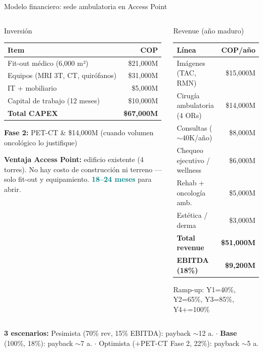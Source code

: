 \documentclass[aspectratio=169, 11pt]{beamer}
\newcommand{\highlight}[1]{\textcolor{teal}{\textbf{#1}}}
\begin{document}
\begin{frame}{Modelo financiero: sede ambulatoria en Access Point}
\begin{columns}[T]
\begin{block}{\small Inversión}
\scriptsize
\begin{tabular}{@{}lr@{}}
\toprule
\textbf{Item} & \textbf{COP} \\
\midrule
Fit-out médico (6,000 m²) & \$21,000M \\
Equipos (MRI 3T, CT, quirófanos) & \$31,000M \\
IT + mobiliario & \$5,000M \\
Capital de trabajo (12 meses) & \$10,000M \\
\midrule
\textbf{Total CAPEX} & \textbf{\$67,000M} \\
\bottomrule
\end{tabular}

\vspace{2pt}
{\tiny\textbf{Fase 2:} PET-CT \& \$14,000M (cuando volumen oncológico lo justifique)}

\vspace{2pt}
{\tiny\textbf{Ventaja Access Point:} edificio existente (4 torres). No hay costo de construcción ni terreno --- solo fit-out y equipamiento. \highlight{18--24 meses} para abrir.}
\end{block}

\begin{exampleblock}{\small Revenue (año maduro)}
\scriptsize
\begin{tabular}{@{}lr@{}}
\toprule
\textbf{Línea} & \textbf{COP/año} \\
\midrule
Imágenes (TAC, RMN) & \$15,000M \\
Cirugía ambulatoria (4 ORs) & \$14,000M \\
Consultas ($\sim$40K/año) & \$8,000M \\
Chequeo ejecutivo / wellness & \$6,000M \\
Rehab + oncología amb. & \$5,000M \\
Estética / derma & \$3,000M \\
\midrule
\textbf{Total revenue} & \textbf{\$51,000M} \\
\textbf{EBITDA (18\%)} & \textbf{\$9,200M} \\
\bottomrule
\end{tabular}

\vspace{2pt}
Ramp-up: Y1=40\%, Y2=65\%, Y3=85\%, Y4+=100\%
\end{exampleblock}
\end{columns}

\vspace{1pt}
{\tiny\textbf{3 escenarios:} Pesimista (70\% rev, 15\% EBITDA): payback $\sim$12 a. $\cdot$ \textbf{Base} (100\%, 18\%): payback $\sim$7 a. $\cdot$ Optimista (+PET-CT Fase 2, 22\%): payback $\sim$5 a.}
\end{frame}
\end{document}
